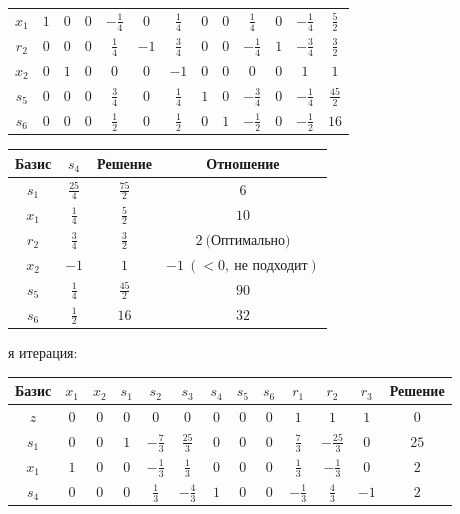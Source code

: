 \documentclass{article}%
\begin{document}
\begin{flushleft}
\begin{tabular}{|c|ccccccccccc|c|}
$x_{1}$&$1$&$0$&$0$&$-\frac{1}{4}$&$0$&$\frac{1}{4}$&$0$&$0$&$\frac{1}{4}$&$0$&$-\frac{1}{4}$&$\frac{5}{2}$\\%
$r_{2}$&$0$&$0$&$0$&$\frac{1}{4}$&$-1$&$\frac{3}{4}$&$0$&$0$&$-\frac{1}{4}$&$1$&$-\frac{3}{4}$&$\frac{3}{2}$\\%
$x_{2}$&$0$&$1$&$0$&$0$&$0$&$-1$&$0$&$0$&$0$&$0$&$1$&$1$\\%
$s_{5}$&$0$&$0$&$0$&$\frac{3}{4}$&$0$&$\frac{1}{4}$&$1$&$0$&$-\frac{3}{4}$&$0$&$-\frac{1}{4}$&$\frac{45}{2}$\\%
$s_{6}$&$0$&$0$&$0$&$\frac{1}{2}$&$0$&$\frac{1}{2}$&$0$&$1$&$-\frac{1}{2}$&$0$&$-\frac{1}{2}$&$16$\\%
\hline%
\end{tabular}%
\newline%
\newline%
\newline%
\begin{tabular}{|cccc|}%
\hline%
Базис&$s_{4}$&Решение&Отношение\\%
\hline%
$s_{1}$&$\frac{25}{4}$&$\frac{75}{2}$&$6$\\%
$x_{1}$&$\frac{1}{4}$&$\frac{5}{2}$&$10$\\%
$r_{2}$&$\frac{3}{4}$&$\frac{3}{2}$&$2\: \text{(Оптимально)}$\\%
$x_{2}$&$-1$&$1$&$-1\: (< 0, \: \text{не подходит})$\\%
$s_{5}$&$\frac{1}{4}$&$\frac{45}{2}$&$90$\\%
$s_{6}$&$\frac{1}{2}$&$16$&$32$\\%
\hline%
\end{tabular}%
\newline%
\newline%
я итерация: %
\newline%
\newline%
\renewcommand{\arraystretch}{1.3}%
\begin{tabular}{|c|ccccccccccc|c|}%
\hline%
Базис&$x_{1}$&$x_{2}$&$s_{1}$&$s_{2}$&$s_{3}$&$s_{4}$&$s_{5}$&$s_{6}$&$r_{1}$&$r_{2}$&$r_{3}$&Решение\\%
\hline%
$z$&$0$&$0$&$0$&$0$&$0$&$0$&$0$&$0$&$1$&$1$&$1$&$0$\\%
\hline%
$s_{1}$&$0$&$0$&$1$&$-\frac{7}{3}$&$\frac{25}{3}$&$0$&$0$&$0$&$\frac{7}{3}$&$-\frac{25}{3}$&$0$&$25$\\%
$x_{1}$&$1$&$0$&$0$&$-\frac{1}{3}$&$\frac{1}{3}$&$0$&$0$&$0$&$\frac{1}{3}$&$-\frac{1}{3}$&$0$&$2$\\%
$s_{4}$&$0$&$0$&$0$&$\frac{1}{3}$&$-\frac{4}{3}$&$1$&$0$&$0$&$-\frac{1}{3}$&$\frac{4}{3}$&$-1$&$2$\\%

\end{tabular}
\end{flushleft}
\end{document}
